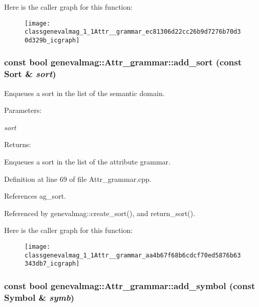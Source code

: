 Here is the caller graph for this function:\nopagebreak
\begin{figure}[H]
\begin{center}
\leavevmode
\texttt{[image: classgenevalmag\_1\_1Attr\_\_grammar\_ec81306d22cc26b9d7276b70d30d329b\_icgraph]}
\end{center}
\end{figure}
\hypertarget{classgenevalmag_1_1Attr__grammar_aa4b67f68b6cdcf70ed5876b63343db7}{
\subsubsection[{add\_\-sort}]{\setlength{\rightskip}{0pt plus 5cm}const bool genevalmag::Attr\_\-grammar::add\_\-sort (const {\bf Sort} \& {\em sort})}}
\label{classgenevalmag_1_1Attr__grammar_aa4b67f68b6cdcf70ed5876b63343db7}


Enqueues a sort in the list of the semantic domain. \begin{Desc}
\item[Parameters:]
\begin{description}
\item[{\em sort}]\end{description}
\end{Desc}
\begin{Desc}
\item[Returns:]\end{Desc}
Enqueues a sort in the list of the attribute grammar. 

Definition at line 69 of file Attr\_\-grammar.cpp.

References ag\_\-sort.

Referenced by genevalmag::create\_\-sort(), and return\_\-sort().

Here is the caller graph for this function:\nopagebreak
\begin{figure}[H]
\begin{center}
\leavevmode
\texttt{[image: classgenevalmag\_1\_1Attr\_\_grammar\_aa4b67f68b6cdcf70ed5876b63343db7\_icgraph]}
\end{center}
\end{figure}
\hypertarget{classgenevalmag_1_1Attr__grammar_66644b6cede73b6dcbdc7b6b7ef8826d}{
\subsubsection[{add\_\-symbol}]{\setlength{\rightskip}{0pt plus 5cm}const bool genevalmag::Attr\_\-grammar::add\_\-symbol (const {\bf Symbol} \& {\em symb})}}
\label{classgenevalmag_1_1Attr__grammar_66644b6cede73b6dcbdc7b6b7ef8826d}


